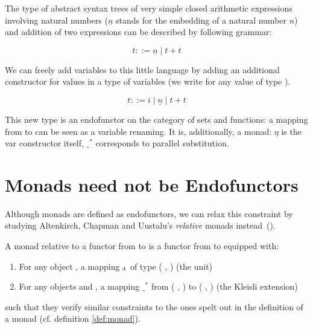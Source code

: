 \begin{example}
\label{example:arithsetexample}
The type of abstract syntax trees of very simple closed arithmetic expressions
involving natural numbers ($\underline{n}$ stands for the embedding of a natural
number $n$) and addition of two expressions can be described by following
grammar:

$$t ::= \underline{n} \mid t + t$$

We can freely add variables to this little language by adding an additional
constructor for values in a type of variables  (we write  for any
value of type ).

$$t ::= i \mid \underline{n} \mid t + t$$

This new type is an endofunctor on the category of sets and functions: a
mapping from { to } can be seen as a variable renaming. It is,
additionally, a monad: $η$ is the var constructor itself, $\_^*$ corresponds
to parallel substitution.

\end{example}

\section{Monads need not be Endofunctors}\label{sec:relativemonad}

Although monads are defined as endofunctors, we can relax this
constraint by studying Altenkirch, Chapman and Uustalu's
\emph{relative} monads instead~(\citeyear{Altenkirch2010,JFR4389}).

\begin{definition}
\label{def:relative-monad}
A monad relative to a functor  from  to 
is a functor  from  to  equipped with:
\begin{enumerate}
  \item For any object , a mapping $_{\AB{A}}$ of type
    {( ,  )} (the unit)
  \item For any objects  and , a mapping $\_^*$
    from {( ,  )}
    to {( ,  )} (the Kleisli extension)
\end{enumerate}

such that they verify similar constraints to the ones spelt out in the
definition of a monad (cf. definition \ref{def:monad}).
\end{definition}

